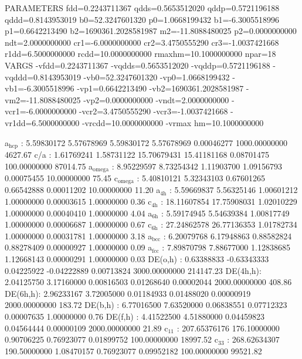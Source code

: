 \documentclass[11pt]{article}
\begin{document}
PARAMETERS
  fdd=0.2243711367 qdds=0.5653512020 qddp=0.5721196188 qddd=0.8143953019 b0=52.3247601320 p0=1.0668199432 b1=-6.3005518996 p1=0.6642213490 b2=1690361.2028581987 m2=-11.8088480025 p2=0.0000000000 ndt=2.0000000000 cr1=-6.0000000000 cr2=3.4750555290 cr3=-1.0037421668 r1dd=6.5000000000 rcdd=10.0000000000 rmaxhm=10.1000000000 npar=18 
VARGS
    -vfdd=0.2243711367 -vqdds=0.5653512020 -vqddp=0.5721196188 -vqddd=0.8143953019 -vb0=52.3247601320 -vp0=1.0668199432 -vb1=-6.3005518996 -vp1=0.6642213490 -vb2=1690361.2028581987 -vm2=-11.8088480025 -vp2=0.0000000000 -vndt=2.0000000000 -vcr1=-6.0000000000 -vcr2=3.4750555290 -vcr3=-1.0037421668 -vr1dd=6.5000000000 -vrcdd=10.0000000000 -vrmax
hm=10.1000000000 


a\(_{\text{hcp}}\)   :   5.59830172   5.57678969   5.59830172   5.57678969   0.00046277 1000.00000000      4627.67
c/a     :   1.61769241   1.58731122  15.70679431  15.41181168   0.08701475 100.00000000     87014.75
a\(_{\text{omega}}\) :   8.95229597   8.73254342   1.11903700   1.09156793   0.00075455  10.00000000        75.45
c\(_{\text{omega}}\) :   5.40810121   5.32343103   0.67601265   0.66542888   0.00011202  10.00000000        11.20
a\(_{\text{4h}}\)    :   5.59669837   5.56325146   1.00601212   1.00000000   0.00003615   1.00000000         0.36
c\(_{\text{4h}}\)    :  18.11607854  17.75908031   1.02010229   1.00000000   0.00040410   1.00000000         4.04
a\(_{\text{6h}}\)    :   5.59174945   5.54639384   1.00817749   1.00000000   0.00006687   1.00000000         0.67
c\(_{\text{6h}}\)    :  27.24862578  26.77136353   1.01782734   1.00000000   0.00031781   1.00000000         3.18
a\(_{\text{bcc}}\)   :   6.20079768   6.17948863   0.88582824   0.88278409   0.00000927   1.00000000         0.09
a\(_{\text{fcc}}\)   :   7.89870798   7.88677000   1.12838685   1.12668143   0.00000291   1.00000000         0.03
DE(o,h) :   0.63388833  -0.63343333   0.04225922  -0.04222889   0.00713824 3000.00000000    214147.23
DE(4h,h):   2.04125750   3.17160000   0.00816503   0.01268640   0.00002044 2000.00000000       408.86
DE(6h,h):   2.96233167   3.72005000   0.01184933   0.01488020   0.00000919 2000.00000000       183.72
DE(b,h) :   6.77016500   7.63520000   0.06838551   0.07712323   0.00007635   1.00000000         0.76
DE(f,h) :   4.41522500   4.51880000   0.04459823   0.04564444   0.00000109 2000.00000000        21.89
c\(_{\text{11}}\)    : 207.65376176 176.10000000   0.90706225   0.76923077   0.01899752 100.00000000     18997.52
c\(_{\text{33}}\)    : 268.62634307 190.50000000   1.08470157   0.76923077   0.09952182 100.00000000     99521.82
\end{document}
